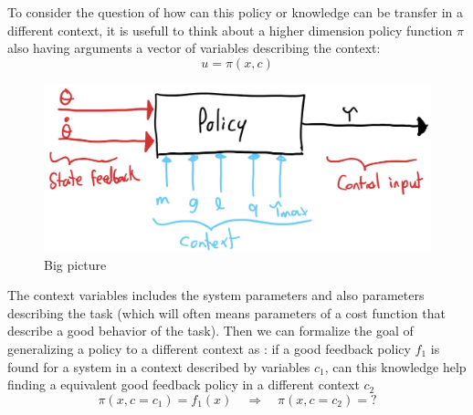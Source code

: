 To consider the question of how can this policy or knowledge can be transfer in a different context, it is usefull to think about a higher dimension policy function $\pi$ also having arguments a vector of variables describing the context:
\begin{equation}
u
=
\pi \left(
x,
c
\right)
\end{equation}

\begin{figure}[H]
\begin{center}
\includegraphics[width=0.99\linewidth]{fig/policy_context.jpg}
\caption{Big picture}\label{fig:policy_context}
\end{center}
\end{figure}

The context variables includes the system parameters and also parameters describing the task (which will often means parameters of a cost function that describe a good behavior of the task). Then we can formalize the goal of generalizing a policy to a different context as : if a good feedback policy $f_1$ is found for a system in a context described by variables $c_1$, can this knowledge help finding a equivalent good feedback policy in a different context $c_2$
\begin{equation}
\pi \left(
x,
c = c_1
\right) = 
f_1 \left(
x 
\right) 
\quad \Rightarrow \quad
\pi \left(
x,
c = c_2
\right) = ?
\end{equation}

